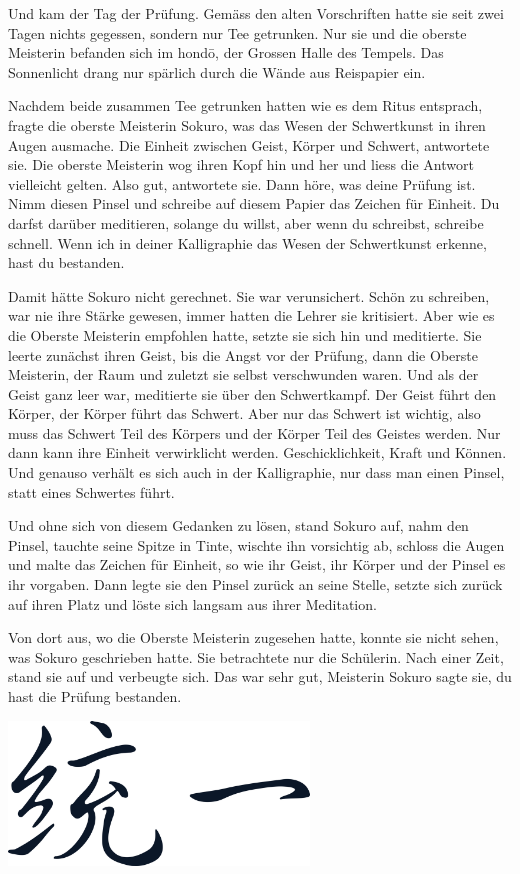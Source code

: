 Und kam der Tag der Prüfung. Gemäss den alten Vorschriften hatte sie seit zwei Tagen nichts gegessen, sondern nur Tee getrunken. Nur sie und die oberste Meisterin befanden sich im hondō, der Grossen Halle des Tempels. Das Sonnenlicht drang nur spärlich durch die Wände aus Reispapier ein.

Nachdem beide zusammen Tee getrunken hatten wie es dem Ritus entsprach, fragte die oberste Meisterin Sokuro, was das Wesen der Schwertkunst in ihren Augen ausmache. Die Einheit zwischen Geist, Körper und Schwert, antwortete sie. Die oberste Meisterin wog ihren Kopf hin und her und liess die Antwort vielleicht gelten. Also gut, antwortete sie. Dann höre, was deine Prüfung ist. Nimm diesen Pinsel und schreibe auf diesem Papier das Zeichen für Einheit. Du darfst darüber meditieren, solange du willst, aber wenn du schreibst, schreibe schnell. Wenn ich in deiner Kalligraphie das Wesen der Schwertkunst erkenne, hast du bestanden.

Damit hätte Sokuro nicht gerechnet. Sie war verunsichert. Schön zu schreiben, war nie ihre Stärke gewesen, immer hatten die Lehrer sie kritisiert. Aber wie es die Oberste Meisterin empfohlen hatte, setzte sie sich hin und meditierte. Sie leerte zunächst ihren Geist, bis die Angst vor der Prüfung, dann die Oberste Meisterin, der Raum und zuletzt sie selbst verschwunden waren. Und als der Geist ganz leer war, meditierte sie über den Schwertkampf. Der Geist führt den Körper, der Körper führt das Schwert. Aber nur das Schwert ist wichtig, also muss das Schwert Teil des Körpers und der Körper Teil des Geistes werden. Nur dann kann ihre Einheit verwirklicht werden. Geschicklichkeit, Kraft und Können. Und genauso verhält es sich auch in der Kalligraphie, nur dass man einen Pinsel, statt eines Schwertes führt.

Und ohne sich von diesem Gedanken zu lösen, stand Sokuro auf, nahm den Pinsel, tauchte seine Spitze in Tinte, wischte ihn vorsichtig ab, schloss die Augen und malte das Zeichen für Einheit, so wie ihr Geist, ihr Körper und der Pinsel es ihr vorgaben. Dann legte sie den Pinsel zurück an seine Stelle, setzte sich zurück auf ihren Platz und löste sich langsam aus ihrer Meditation.

Von dort aus, wo die Oberste Meisterin zugesehen hatte, konnte sie nicht sehen, was Sokuro geschrieben hatte. Sie betrachtete nur die Schülerin. Nach einer Zeit, stand sie auf und verbeugte sich. Das war sehr gut, Meisterin Sokuro sagte sie, du hast die Prüfung bestanden.  \hfill {}

\begin{center}
\includegraphics[width=0.6\textwidth]{./bilder/vereinigung.png}
\end{center}
\newpage
 

